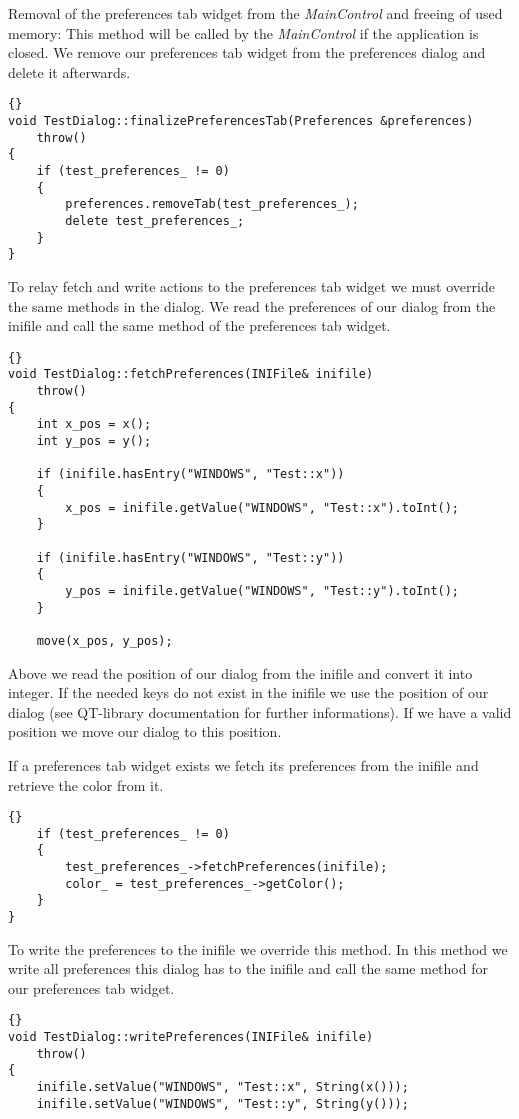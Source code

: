 Removal of the preferences tab widget from the {\em MainControl} and freeing
of used memory: This method will be called by the {\em MainControl} if the
application is closed. We remove our preferences tab widget from the
preferences dialog and delete it afterwards.
\begin{lstlisting}{}
void TestDialog::finalizePreferencesTab(Preferences &preferences)
	throw()
{
	if (test_preferences_ != 0)
	{
		preferences.removeTab(test_preferences_);
		delete test_preferences_;
	}
}
\end{lstlisting}

To relay fetch and write actions to the preferences tab widget we must override
the same methods in the dialog.  We read the preferences of our dialog from
the inifile and call the same method of the preferences tab widget.
\begin{lstlisting}{}
void TestDialog::fetchPreferences(INIFile& inifile)
	throw()
{
	int x_pos = x();
	int y_pos = y();

	if (inifile.hasEntry("WINDOWS", "Test::x"))
	{
		x_pos = inifile.getValue("WINDOWS", "Test::x").toInt();
	}

	if (inifile.hasEntry("WINDOWS", "Test::y"))
	{
		y_pos = inifile.getValue("WINDOWS", "Test::y").toInt();
	}

	move(x_pos, y_pos);
\end{lstlisting}
Above we read the position of our dialog from the inifile and convert it into
integer. If the needed keys do not exist in the inifile we use the position of
our dialog (see QT-library documentation for further informations). If we have
a valid position we move our dialog to this position.  

If a preferences tab
widget exists we fetch its preferences from the inifile and retrieve the color
from it.
\begin{lstlisting}{}
	if (test_preferences_ != 0)
	{
		test_preferences_->fetchPreferences(inifile);
		color_ = test_preferences_->getColor();
	}
}
\end{lstlisting}


To write the preferences to the inifile we override this method. In this
method we write all preferences this dialog has to the inifile and call the
same method for our preferences tab widget.
\begin{lstlisting}{}
void TestDialog::writePreferences(INIFile& inifile)
	throw()
{
	inifile.setValue("WINDOWS", "Test::x", String(x()));
	inifile.setValue("WINDOWS", "Test::y", String(y()));
\end{lstlisting}

